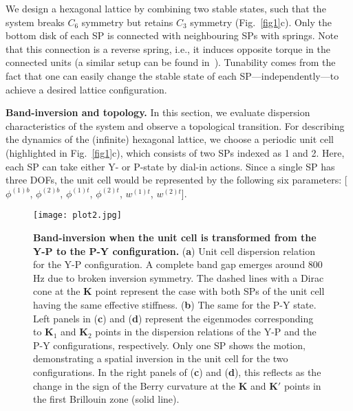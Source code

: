 \documentclass[aps,preprint,onecolumn,showpacs,superscriptaddress,groupedaddress]{revtex4}  %
\begin{document}

We design a hexagonal lattice by combining two stable states, such that the system breaks $C_6$ symmetry but retains $C_3$ symmetry (Fig.~\ref{fig1}c). Only the bottom disk of each SP is connected with neighbouring SPs with springs. Note that this connection is a reverse spring, i.e., it induces opposite torque in the connected units (a similar setup can be found in~\citep{34}). Tunability comes from the fact that one can easily change the stable state of each SP---independently---to achieve a desired lattice configuration.

\vspace{3ex}
\textbf{Band-inversion and topology.} In this section, we evaluate dispersion characteristics of the system and observe a topological transition. For describing the dynamics of the (infinite) hexagonal lattice, we  choose a periodic unit cell (highlighted in Fig.~\ref{fig1}c), which consists of two SPs indexed as 1 and 2. Here, each SP can take either Y- or P-state by dial-in actions. Since a single SP has three DOFs, the unit cell would be represented by the following six parameters: [$\phi^{(1)b}$, $\phi^{(2)b}$, $\phi^{(1)t}$, $\phi^{(2)t}$, $w^{(1)t}$, $w^{(2)t}$]. %

\begin{figure}[t]
\centering
\texttt{[image: plot2.jpg]}
\caption{\textbf{Band-inversion when the unit cell is transformed from the Y-P to the P-Y configuration.} (\textbf{a}) Unit cell dispersion relation for the Y-P configuration. A complete band gap emerges around 800 Hz due to broken inversion symmetry. The dashed lines with a Dirac cone at the \textbf{K} point represent the case with both SPs of the unit cell having the same effective stiffness. (\textbf{b}) The same for the P-Y state.  Left panels in (\textbf{c}) and (\textbf{d}) represent the eigenmodes corresponding to \textbf{K$_1$} and \textbf{K$_2$} points in the dispersion relations of the Y-P and the P-Y configurations, respectively. Only one SP shows the motion, demonstrating a spatial inversion in the unit cell for the two configurations. In the right panels of (\textbf{c}) and (\textbf{d}), this reflects as the change in the sign of the Berry curvature at the \textbf{K} and \textbf{K$'$} points in the first Brillouin zone (solid line). }
\label{fig2}
\end{figure} 
\end{document}
